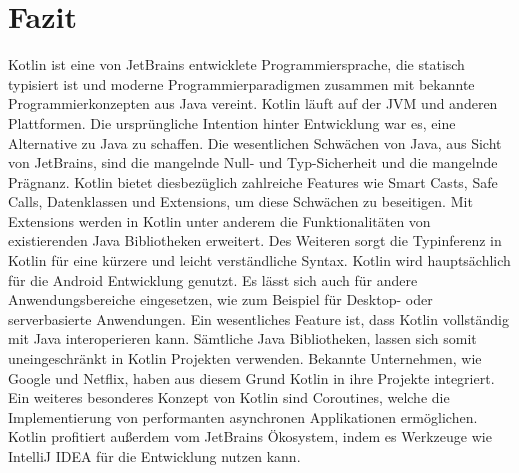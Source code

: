 \documentclass{article}
\begin{document}
\section{Fazit}
Kotlin ist eine von JetBrains entwicklete Programmiersprache, die statisch typisiert ist und moderne Programmierparadigmen zusammen mit bekannte Programmierkonzepten aus Java vereint. Kotlin läuft auf der JVM und anderen Plattformen. Die ursprüngliche Intention hinter Entwicklung war es, eine Alternative zu Java zu schaffen. Die wesentlichen Schwächen von Java, aus Sicht von JetBrains, sind die mangelnde Null- und Typ-Sicherheit und die mangelnde Prägnanz. Kotlin bietet diesbezüglich zahlreiche Features wie Smart Casts, Safe Calls, Datenklassen und Extensions, um diese Schwächen zu beseitigen. Mit Extensions werden in Kotlin unter anderem die Funktionalitäten von existierenden Java Bibliotheken erweitert. Des Weiteren sorgt die Typinferenz in Kotlin für eine kürzere und leicht verständliche Syntax. Kotlin wird hauptsächlich für die Android Entwicklung genutzt. Es lässt sich auch für andere Anwendungsbereiche eingesetzen, wie zum Beispiel für Desktop- oder serverbasierte Anwendungen. Ein wesentliches Feature ist, dass Kotlin vollständig mit Java interoperieren kann. Sämtliche Java Bibliotheken, lassen sich somit uneingeschränkt in Kotlin Projekten verwenden. Bekannte Unternehmen, wie Google und Netflix, haben aus diesem Grund Kotlin in ihre Projekte integriert. Ein weiteres besonderes Konzept von Kotlin sind Coroutines, welche die Implementierung von performanten asynchronen Applikationen ermöglichen. Kotlin profitiert außerdem vom JetBrains Ökosystem, indem es Werkzeuge wie IntelliJ IDEA für die Entwicklung nutzen kann.



\end{document}
